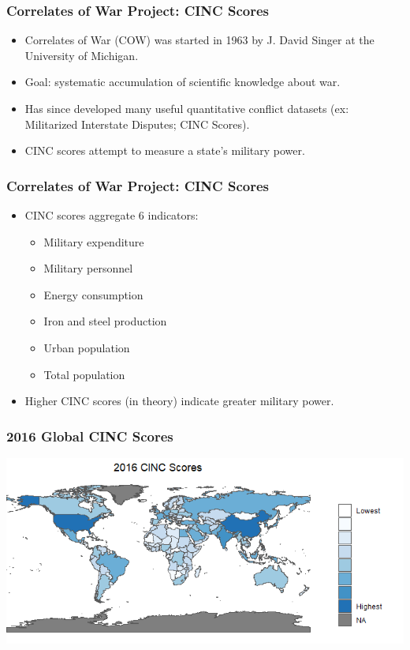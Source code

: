 \documentclass{beamer}
\begin{document}
\begin{frame} 
	\frametitle{\LARGE{Correlates of War Project: CINC Scores}}
	\begin{itemize}
		\item Correlates of War (COW) was started in 1963 by J. David Singer at the University of Michigan. \pause
		\item Goal: systematic accumulation of scientific knowledge about war. \pause
		\item Has since developed many useful quantitative conflict datasets (ex: Militarized Interstate Disputes; CINC Scores).
		\item CINC scores attempt to measure a state's military power.		
	\end{itemize}
\end{frame}

\begin{frame} 
	\frametitle{\LARGE{Correlates of War Project: CINC Scores}}
	\begin{itemize}
		\item CINC scores aggregate 6 indicators: \pause
		\begin{itemize}
			\item Military expenditure
			\item Military personnel
			\item Energy consumption
			\item Iron and steel production
			\item Urban population
			\item Total population \pause
		\end{itemize}	
		\item Higher CINC scores (in theory) indicate greater military power.	
	\end{itemize}
\end{frame}

\begin{frame} 
	\frametitle{\LARGE{2016 Global CINC Scores}}	
	\centering
	\includegraphics[width=\textwidth,height=0.9\textheight,keepaspectratio]{CINC2016.png}
\end{frame}
\end{document}
